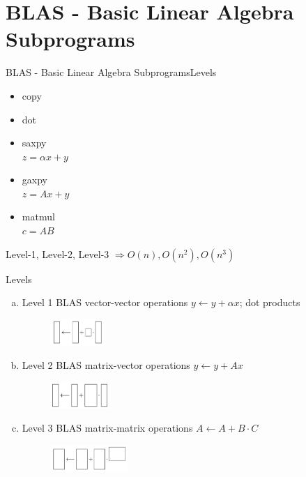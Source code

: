 \section{BLAS - Basic Linear Algebra Subprograms}
	\begin{frame}{BLAS - Basic Linear Algebra Subprograms}{Levels}
		\begin{itemize}
			\item copy
			\item dot
			\item saxpy \\ \small $ z = \alpha x + y $ \normalsize
			\item gaxpy \\ \small $ z = Ax + y $ \normalsize
			\item matmul \\ \small  $ c = AB $ \normalsize
		\end{itemize}
		Level-1, Level-2, Level-3 $ \Rightarrow O(n), O(n^2), O(n^3)$
	\end{frame}
	\begin{frame}{Levels}
		\begin{enumerate}[a)]
			\item Level 1 BLAS vector-vector operations
			$y \leftarrow y + \alpha x$; dot products
			\begin{figure}
				\includegraphics[height=1cm]{img/13/level1}
			\end{figure}
			\item Level 2 BLAS matrix-vector operations
			$y \leftarrow y + Ax$
			\begin{figure}
				\includegraphics[height=1cm]{img/13/level2}
			\end{figure}
			\item Level 3 BLAS matrix-matrix operations
			$A \leftarrow A + B \cdot C$
			\begin{figure}
				\includegraphics[height=1cm]{img/13/level3}
			\end{figure}
		\end{enumerate}
	\end{frame}

